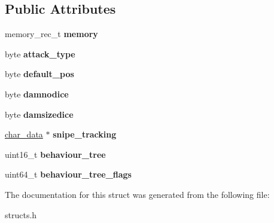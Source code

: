 \subsection*{Public Attributes}
\begin{DoxyCompactItemize}
\item 
\mbox{\label{structmob__special__data_a0519f9e36be701941fc758bc8cd8588f}} 
memory\+\_\+rec\+\_\+t {\bfseries memory}
\item 
\mbox{\label{structmob__special__data_a6fed6831bec662865e54b3aed10cd5e7}} 
byte {\bfseries attack\+\_\+type}
\item 
\mbox{\label{structmob__special__data_ab5e5ba5e7e449a683985049435209615}} 
byte {\bfseries default\+\_\+pos}
\item 
\mbox{\label{structmob__special__data_a20fd98b38e546fcaa269a4c39f6bb1de}} 
byte {\bfseries damnodice}
\item 
\mbox{\label{structmob__special__data_af9652f6236ab9cbebf2fba0c001689c1}} 
byte {\bfseries damsizedice}
\item 
\mbox{\label{structmob__special__data_a7aa167d43c9565a9adca9f2f3871143d}} 
\hyperlink{structchar__data}{char\+\_\+data} $\ast$ {\bfseries snipe\+\_\+tracking}
\item 
\mbox{\label{structmob__special__data_a231979d3eefd32373b1eed1135e6bdde}} 
uint16\+\_\+t {\bfseries behaviour\+\_\+tree}
\item 
\mbox{\label{structmob__special__data_add663891189bbac8c9eddc85bc2d333b}} 
uint64\+\_\+t {\bfseries behaviour\+\_\+tree\+\_\+flags}
\end{DoxyCompactItemize}


The documentation for this struct was generated from the following file\+:\begin{DoxyCompactItemize}
\item 
structs.\+h\end{DoxyCompactItemize}
